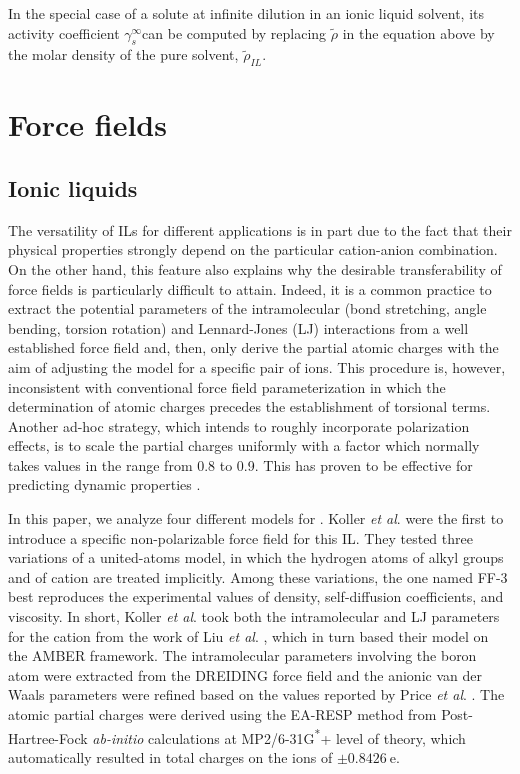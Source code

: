 \documentclass[3p,twocolumn]{elsarticle}
\providecommand{\DIFadd}[1]{{\protect\color{blue}\uwave{#1}}} %
\providecommand{\DIFaddbegin}{} %
\providecommand{\DIFaddend}{} %
\newcommand{\DIFaddincludegraphics}[2][]{{\color{blue}\fbox{\DIFOincludegraphics[#1]{#2}}}} %
\DeclareRobustCommand{\DIFaddbegin}{\DIFOaddbegin \let\includegraphics\DIFaddincludegraphics} %
\DeclareRobustCommand{\DIFaddend}{\DIFOaddend \let\includegraphics\DIFOincludegraphics} %
\begin{document}
In the special case of a solute at infinite dilution in an ionic liquid solvent, its activity coefficient \DIFaddbegin \DIFadd{(}\DIFaddend $\gamma^\infty_s$\DIFaddbegin \DIFadd{) }\DIFaddend can be computed by replacing $\tilde{\rho}$ in the equation above by the molar density of the pure solvent, $\tilde{\rho}_\textit{IL}$.

\section{Force fields}
\label{sec:force_field}

\subsection{Ionic liquids}
\label{sec:force_field_il}

The versatility of ILs for different applications is in part due to the fact that their physical properties strongly depend on the particular cation-anion combination.
On the other hand, this feature also explains why the desirable transferability of force fields is particularly difficult to attain.
Indeed, it is a common practice to extract the potential parameters of the intramolecular (bond stretching, angle bending, torsion rotation) and Lennard-Jones (LJ) interactions from a well established force field and, then, only derive the partial atomic charges with the aim of adjusting the model for a specific pair of ions.
This procedure is, however, inconsistent with conventional force field parameterization in which the determination of atomic charges precedes the establishment of torsional terms.
Another ad-hoc strategy, which intends to roughly incorporate polarization effects, is to scale the partial charges uniformly with a factor which normally takes values in the range from 0.8 to 0.9.
This has proven to be effective for predicting dynamic properties \cite{Schr_der_2012}.

In this paper, we analyze four different models for \ce{[emim][B(CN)_4]}.
Koller \textit{et al}. \cite{Koller_2012} were the first to introduce a specific non-polarizable force field for this IL.
They tested three variations of a united-atoms model, in which the hydrogen atoms of alkyl groups  and  of cation \ce{[emim]^+} are treated implicitly.
Among these variations, the one named FF-3 best reproduces the experimental values of density, self-diffusion coefficients, and viscosity.
In short, Koller \textit{et al}. \cite{Koller_2012} took both the intramolecular and LJ parameters for the cation from the work of Liu \textit{et al}. \cite{Liu_2006}, which in turn based their model on the AMBER \cite{Cornell_1995} framework.
The intramolecular parameters involving the boron atom were extracted from the DREIDING \cite{Mayo_1990} force field and the anionic van der Waals parameters were refined based on the values reported by Price \textit{et al}. \cite{Price_2001}.
The atomic partial charges were derived using the EA-RESP method \cite{Basma_2001} from Post-Hartree-Fock \textit{ab-initio} calculations at MP2/6-31G\textsuperscript{*}+ level of theory, which automatically resulted in total charges on the ions of $\pm0.8426~\mathrm{e}$.
\end{document}
